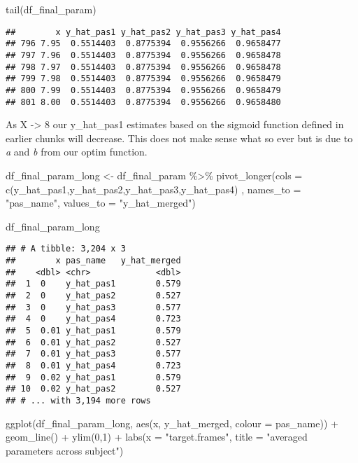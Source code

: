 \documentclass[
]{article}
\newenvironment{Shaded}{\begin{snugshade}}{\end{snugshade}}
\newcommand{\AttributeTok}[1]{\textcolor[rgb]{0.77,0.63,0.00}{#1}}
\newcommand{\DecValTok}[1]{\textcolor[rgb]{0.00,0.00,0.81}{#1}}
\newcommand{\FunctionTok}[1]{\textcolor[rgb]{0.00,0.00,0.00}{#1}}
\newcommand{\NormalTok}[1]{#1}
\newcommand{\OtherTok}[1]{\textcolor[rgb]{0.56,0.35,0.01}{#1}}
\newcommand{\SpecialCharTok}[1]{\textcolor[rgb]{0.00,0.00,0.00}{#1}}
\newcommand{\StringTok}[1]{\textcolor[rgb]{0.31,0.60,0.02}{#1}}
\begin{document}
\begin{Shaded}
\begin{Highlighting}[]
\FunctionTok{tail}\NormalTok{(df\_final\_param)}
\end{Highlighting}
\end{Shaded}

\begin{verbatim}
##        x y_hat_pas1 y_hat_pas2 y_hat_pas3 y_hat_pas4
## 796 7.95  0.5514403  0.8775394  0.9556266  0.9658477
## 797 7.96  0.5514403  0.8775394  0.9556266  0.9658478
## 798 7.97  0.5514403  0.8775394  0.9556266  0.9658478
## 799 7.98  0.5514403  0.8775394  0.9556266  0.9658479
## 800 7.99  0.5514403  0.8775394  0.9556266  0.9658479
## 801 8.00  0.5514403  0.8775394  0.9556266  0.9658480
\end{verbatim}

As X -\textgreater{} 8 our y\_hat\_pas1 estimates based on the sigmoid
function defined in earlier chunks will decrease. This does not make
sense what so ever but is due to \emph{a} and \emph{b} from our optim
function.

\begin{Shaded}
\begin{Highlighting}[]
\NormalTok{df\_final\_param\_long }\OtherTok{\textless{}{-}}\NormalTok{ df\_final\_param }\SpecialCharTok{\%\textgreater{}\%} 
  \FunctionTok{pivot\_longer}\NormalTok{(}\AttributeTok{cols =} \FunctionTok{c}\NormalTok{(y\_hat\_pas1,y\_hat\_pas2,y\_hat\_pas3,y\_hat\_pas4) , }\AttributeTok{names\_to =} \StringTok{"pas\_name"}\NormalTok{, }\AttributeTok{values\_to =} \StringTok{"y\_hat\_merged"}\NormalTok{)}

\NormalTok{df\_final\_param\_long}
\end{Highlighting}
\end{Shaded}

\begin{verbatim}
## # A tibble: 3,204 x 3
##        x pas_name   y_hat_merged
##    <dbl> <chr>             <dbl>
##  1  0    y_hat_pas1        0.579
##  2  0    y_hat_pas2        0.527
##  3  0    y_hat_pas3        0.577
##  4  0    y_hat_pas4        0.723
##  5  0.01 y_hat_pas1        0.579
##  6  0.01 y_hat_pas2        0.527
##  7  0.01 y_hat_pas3        0.577
##  8  0.01 y_hat_pas4        0.723
##  9  0.02 y_hat_pas1        0.579
## 10  0.02 y_hat_pas2        0.527
## # ... with 3,194 more rows
\end{verbatim}

\begin{Shaded}
\begin{Highlighting}[]
\FunctionTok{ggplot}\NormalTok{(df\_final\_param\_long, }\FunctionTok{aes}\NormalTok{(x, y\_hat\_merged, }\AttributeTok{colour =}\NormalTok{ pas\_name)) }\SpecialCharTok{+}
  \FunctionTok{geom\_line}\NormalTok{() }\SpecialCharTok{+} \FunctionTok{ylim}\NormalTok{(}\DecValTok{0}\NormalTok{,}\DecValTok{1}\NormalTok{) }\SpecialCharTok{+} \FunctionTok{labs}\NormalTok{(}\AttributeTok{x =} \StringTok{"target.frames"}\NormalTok{, }\AttributeTok{title =} \StringTok{"averaged parameters across subject"}\NormalTok{)}
\end{Highlighting}
\end{Shaded}
\end{document}
